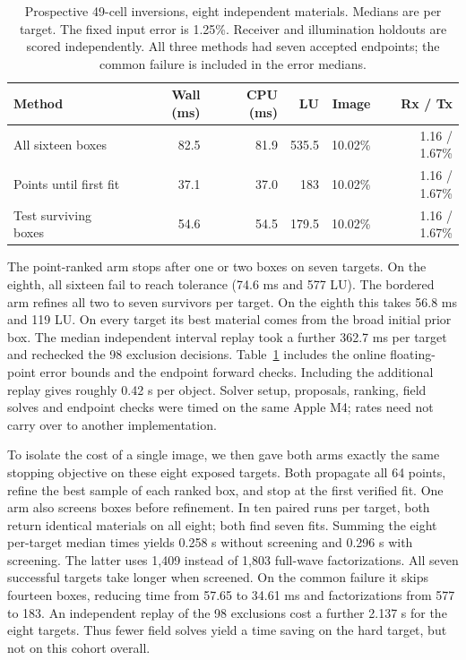 \begin{table}[!htbp]\centering\small
\caption{Prospective 49-cell inversions, eight independent materials. Medians are per target. The fixed input error is 1.25\%. Receiver and illumination holdouts are scored independently. All three methods had seven accepted endpoints; the common failure is included in the error medians.}\label{tab:pool}
\setlength{\tabcolsep}{3pt}\begin{tabular}{@{}lrrrrr@{}}\toprule
Method & Wall (ms) & CPU (ms) & LU & Image & Rx / Tx\\\midrule
All sixteen boxes & 82.5 & 81.9 & 535.5 & 10.02\% & 1.16 / 1.67\%\\
Points until first fit & 37.1 & 37.0 & 183 & 10.02\% & 1.16 / 1.67\%\\
Test surviving boxes & 54.6 & 54.5 & 179.5 & 10.02\% & 1.16 / 1.67\%\\
\bottomrule\end{tabular}
\end{table}
The point-ranked arm stops after one or two boxes on seven targets. On the eighth, all sixteen fail to reach tolerance (74.6 ms and 577 LU). The bordered arm refines all two to seven survivors per target. On the eighth this takes 56.8 ms and 119 LU. On every target its best material comes from the broad initial prior box. The median independent interval replay took a further 362.7 ms per target and rechecked the 98 exclusion decisions. Table~\ref{tab:pool} includes the online floating-point error bounds and the endpoint forward checks. Including the additional replay gives roughly 0.42 s per object. Solver setup, proposals, ranking, field solves and endpoint checks were timed on the same Apple M4; rates need not carry over to another implementation.

To isolate the cost of a single image, we then gave both arms exactly the same stopping objective on these eight exposed targets. Both propagate all 64 points, refine the best sample of each ranked box, and stop at the first verified fit. One arm also screens boxes before refinement. In ten paired runs per target, both return identical materials on all eight; both find seven fits. Summing the eight per-target median times yields 0.258 s without screening and 0.296 s with screening. The latter uses 1,409 instead of 1,803 full-wave factorizations. All seven successful targets take longer when screened. On the common failure it skips fourteen boxes, reducing time from 57.65 to 34.61 ms and factorizations from 577 to 183. An independent replay of the 98 exclusions cost a further 2.137 s for the eight targets. Thus fewer field solves yield a time saving on the hard target, but not on this cohort overall.

